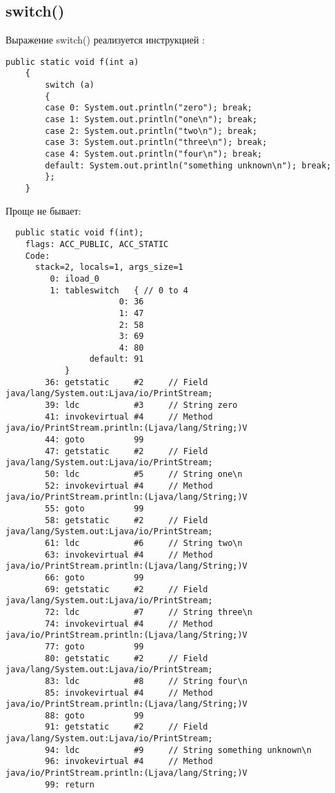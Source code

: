 \subsection{switch()}


Выражение switch() реализуется инструкцией :

\begin{lstlisting}[style=customjava]
	public static void f(int a)
	{
		switch (a)
		{
		case 0: System.out.println("zero"); break;
		case 1: System.out.println("one\n"); break;
		case 2: System.out.println("two\n"); break;
		case 3: System.out.println("three\n"); break;
		case 4: System.out.println("four\n"); break;
		default: System.out.println("something unknown\n"); break;
		};
	}
\end{lstlisting}

Проще не бывает:

\begin{lstlisting}
  public static void f(int);
    flags: ACC_PUBLIC, ACC_STATIC
    Code:
      stack=2, locals=1, args_size=1
         0: iload_0       
         1: tableswitch   { // 0 to 4
                       0: 36
                       1: 47
                       2: 58
                       3: 69
                       4: 80
                 default: 91
            }
        36: getstatic     #2     // Field java/lang/System.out:Ljava/io/PrintStream;
        39: ldc           #3     // String zero
        41: invokevirtual #4     // Method java/io/PrintStream.println:(Ljava/lang/String;)V
        44: goto          99
        47: getstatic     #2     // Field java/lang/System.out:Ljava/io/PrintStream;
        50: ldc           #5     // String one\n
        52: invokevirtual #4     // Method java/io/PrintStream.println:(Ljava/lang/String;)V
        55: goto          99
        58: getstatic     #2     // Field java/lang/System.out:Ljava/io/PrintStream;
        61: ldc           #6     // String two\n
        63: invokevirtual #4     // Method java/io/PrintStream.println:(Ljava/lang/String;)V
        66: goto          99
        69: getstatic     #2     // Field java/lang/System.out:Ljava/io/PrintStream;
        72: ldc           #7     // String three\n
        74: invokevirtual #4     // Method java/io/PrintStream.println:(Ljava/lang/String;)V
        77: goto          99
        80: getstatic     #2     // Field java/lang/System.out:Ljava/io/PrintStream;
        83: ldc           #8     // String four\n
        85: invokevirtual #4     // Method java/io/PrintStream.println:(Ljava/lang/String;)V
        88: goto          99
        91: getstatic     #2     // Field java/lang/System.out:Ljava/io/PrintStream;
        94: ldc           #9     // String something unknown\n
        96: invokevirtual #4     // Method java/io/PrintStream.println:(Ljava/lang/String;)V
        99: return        
\end{lstlisting}
